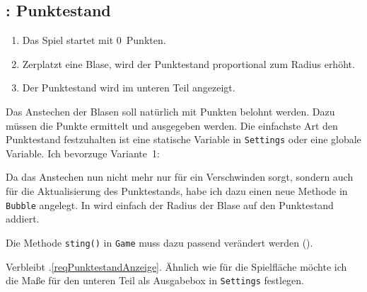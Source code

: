 \subsection{: Punktestand}
    \begin{enumerate}
        \item Das Spiel startet mit 0~Punkten.\label{reqPunktestandNull}
        \item Zerplatzt eine Blase, wird der Punktestand proportional zum Radius erhöht.\label{reqPunktestandRadius}
        \item Der Punktestand wird im unteren Teil angezeigt.\label{reqPunktestandAnzeige}
    \end{enumerate}
\er

Das Anstechen der Blasen soll natürlich mit Punkten belohnt werden. Dazu müssen die Punkte ermittelt und ausgegeben werden. Die einfachste Art den Punktestand festzuhalten ist eine statische Variable in \texttt{Settings} oder eine globale Variable. Ich bevorzuge Variante~1: 


Da das Anstechen nun nicht mehr nur für ein Verschwinden sorgt, sondern auch für die Aktualisierung des Punktestands, habe ich dazu einen neue Methode in \texttt{Bubble} angelegt. In  wird einfach der Radius der Blase auf den Punktestand addiert.


Die Methode \texttt{sting()} in \texttt{Game} muss dazu passend verändert werden ().


Verbleibt .\ref{reqPunktestandAnzeige}. Ähnlich wie für die Spielfläche möchte ich die Maße für den unteren Teil als Ausgabebox in \texttt{Settings} festlegen.


